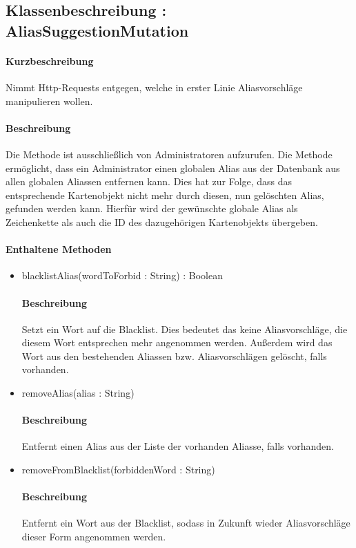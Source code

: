 \subsection{Klassenbeschreibung : AliasSuggestionMutation}%
\paragraph*{Kurzbeschreibung}
Nimmt Http-Requests entgegen, welche in erster Linie Aliasvorschläge manipulieren wollen.
\paragraph*{Beschreibung}
Die Methode ist ausschließlich von Administratoren aufzurufen.
Die Methode ermöglicht, dass ein Administrator einen globalen Alias aus der Datenbank aus allen globalen Aliassen entfernen kann.
Dies hat zur Folge, dass das entsprechende Kartenobjekt nicht mehr durch diesen, nun gelöschten Alias, gefunden werden kann.
Hierfür wird der gewünschte globale Alias als Zeichenkette als auch die ID des dazugehörigen Kartenobjekts übergeben.
\paragraph*{Enthaltene Methoden}
\begin{itemize}
    \item blacklistAlias(wordToForbid : String) : Boolean
    		\paragraph*{Beschreibung}
            Setzt ein Wort auf die Blacklist. Dies bedeutet das keine Aliasvorschläge, die diesem Wort entsprechen mehr angenommen werden.
            Außerdem wird das Wort aus den bestehenden Aliassen bzw. Aliasvorschlägen gelöscht, falls vorhanden.
    \item removeAlias(alias : String)
    		\paragraph*{Beschreibung}
            Entfernt einen Alias aus der Liste der vorhanden Aliasse, falls vorhanden.
    \item removeFromBlacklist(forbiddenWord : String)
    	    \paragraph*{Beschreibung}
            Entfernt ein Wort aus der Blacklist, sodass in Zukunft wieder Aliasvorschläge dieser Form angenommen werden.        
        \end{itemize}